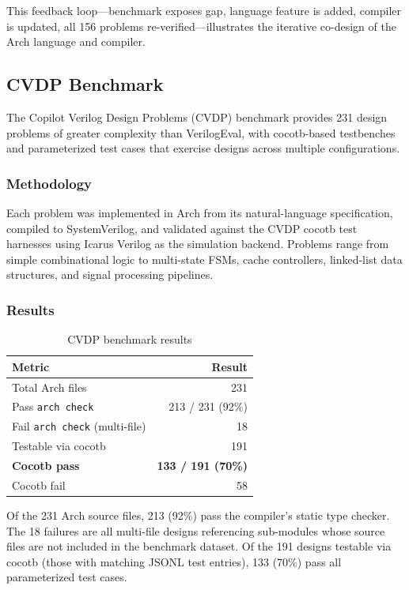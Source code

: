 \documentclass[11pt,twocolumn]{article}
\begin{document}
This feedback loop---benchmark exposes gap, language feature is added, compiler is updated, all 156 problems re-verified---illustrates the iterative co-design of the Arch language and compiler.

\subsection{CVDP Benchmark}\label{sec:cvdp}

The Copilot Verilog Design Problems (CVDP) benchmark provides 231 design problems of greater complexity than VerilogEval, with cocotb-based testbenches and parameterized test cases that exercise designs across multiple configurations.

\subsubsection{Methodology}

Each problem was implemented in Arch from its natural-language specification, compiled to SystemVerilog, and validated against the CVDP cocotb test harnesses using Icarus Verilog as the simulation backend. Problems range from simple combinational logic to multi-state FSMs, cache controllers, linked-list data structures, and signal processing pipelines.

\subsubsection{Results}

\begin{table}[t]
\centering
\caption{CVDP benchmark results}
\label{tab:cvdp}
\footnotesize
\begin{tabular}{@{}lr@{}}
\toprule
\textbf{Metric} & \textbf{Result} \\
\midrule
Total Arch files & 231 \\
Pass \texttt{arch check} & 213 / 231 (92\%) \\
Fail \texttt{arch check} (multi-file) & 18 \\
Testable via cocotb & 191 \\
\textbf{Cocotb pass} & \textbf{133 / 191 (70\%)} \\
Cocotb fail & 58 \\
\bottomrule
\end{tabular}
\end{table}

Of the 231 Arch source files, 213 (92\%) pass the compiler's static type checker. The 18 failures are all multi-file designs referencing sub-modules whose source files are not included in the benchmark dataset. Of the 191 designs testable via cocotb (those with matching JSONL test entries), 133 (70\%) pass all parameterized test cases.
\end{document}
